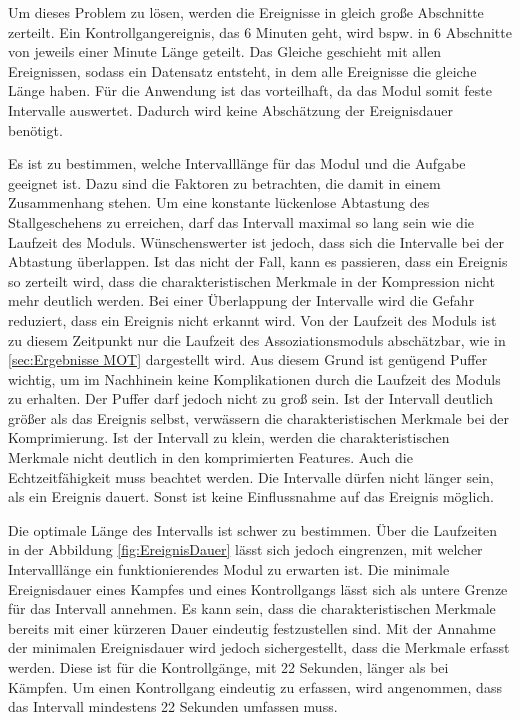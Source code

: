 Um dieses Problem zu lösen, werden die Ereignisse in gleich große Abschnitte zerteilt. Ein Kontrollgangereignis, das 6 Minuten geht, wird bspw. in 6 Abschnitte von jeweils einer Minute Länge geteilt. Das Gleiche geschieht mit allen Ereignissen, sodass ein Datensatz entsteht, in dem alle Ereignisse die gleiche Länge haben. Für die Anwendung ist das vorteilhaft, da das Modul somit feste Intervalle auswertet. Dadurch wird keine Abschätzung der Ereignisdauer benötigt. \par

Es ist zu bestimmen, welche Intervalllänge für das Modul und die Aufgabe geeignet ist. Dazu sind die Faktoren zu betrachten, die damit in einem Zusammenhang stehen. Um eine konstante lückenlose Abtastung des Stallgeschehens zu erreichen, darf das Intervall maximal so lang sein wie die Laufzeit des Moduls. Wünschenswerter ist jedoch, dass sich die Intervalle bei der Abtastung überlappen. Ist das nicht der Fall, kann es passieren, dass ein Ereignis so zerteilt wird, dass die charakteristischen Merkmale in der Kompression nicht mehr deutlich werden. Bei einer Überlappung der Intervalle wird die Gefahr reduziert, dass ein Ereignis nicht erkannt wird. Von der Laufzeit des Moduls ist zu diesem Zeitpunkt nur die Laufzeit des Assoziationsmoduls abschätzbar, wie in \autoref{sec:Ergebnisse MOT} dargestellt wird. Aus diesem Grund ist genügend Puffer wichtig, um im Nachhinein keine Komplikationen durch die Laufzeit des Moduls zu erhalten. Der Puffer darf jedoch nicht zu groß sein. Ist der Intervall deutlich größer als das Ereignis selbst, verwässern die charakteristischen Merkmale bei der Komprimierung. Ist der Intervall zu klein, werden die charakteristischen Merkmale nicht deutlich in den komprimierten Features. Auch die Echtzeitfähigkeit muss beachtet werden. Die Intervalle dürfen nicht länger sein, als ein Ereignis dauert. Sonst ist keine Einflussnahme auf das Ereignis möglich.\par

Die optimale Länge des Intervalls ist schwer zu bestimmen. Über die Laufzeiten in der Abbildung \ref{fig:EreignisDauer} lässt sich jedoch eingrenzen, mit welcher Intervalllänge ein funktionierendes Modul zu erwarten ist. Die minimale Ereignisdauer eines Kampfes und eines Kontrollgangs lässt sich als untere Grenze für das Intervall annehmen. Es kann sein, dass die charakteristischen Merkmale bereits mit einer kürzeren Dauer eindeutig festzustellen sind. Mit der Annahme der minimalen Ereignisdauer wird jedoch sichergestellt, dass die Merkmale erfasst werden. Diese ist für die Kontrollgänge, mit 22 Sekunden, länger als bei Kämpfen. Um einen Kontrollgang eindeutig zu erfassen, wird angenommen, dass das Intervall mindestens 22 Sekunden umfassen muss. \par

